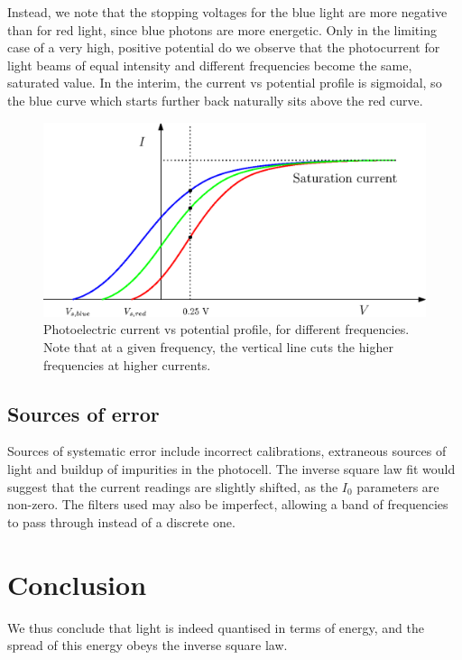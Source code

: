 \documentclass[11pt]{article}
\begin{document}
        Instead, we note that the stopping voltages for the blue light are more negative than for red light, since blue photons
        are more energetic. Only in the limiting case of a very high, positive potential do we observe that the photocurrent for
        light beams of equal intensity and different frequencies become the same, saturated value. In the interim, the current vs
        potential profile is sigmoidal, so the blue curve which starts further back naturally sits above the red curve.
        \begin{figure}[H]
                \centering
                \includegraphics[scale=0.7]{./IV.eps}
                \caption{Photoelectric current vs potential profile, for different frequencies. Note that at a given frequency, the vertical
                line cuts the higher frequencies at higher currents.}
                \label{fig:IV}
        \end{figure}
        

        \subsection{Sources of error}
        Sources of systematic error include incorrect calibrations, extraneous sources of light and buildup of impurities in the photocell.
        The inverse square law fit would suggest that the current readings are slightly shifted, as the $I_0$ parameters are non-zero.
        The filters used may also be imperfect, allowing a band of frequencies to pass through instead of a discrete one.

        \section{Conclusion}
        We thus conclude that light is indeed quantised in terms of energy, and the spread of this energy obeys the inverse square law.

\end{document}

